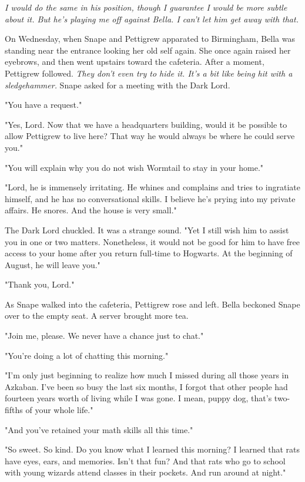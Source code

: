\emph{I would do the same in his position, though I guarantee I would be more subtle about it. But he's playing me off against Bella. I can't let him get away with that.}

On Wednesday, when Snape and Pettigrew apparated to Birmingham, Bella was standing near the entrance looking her old self again. She once again raised her eyebrows, and then went upstairs toward the cafeteria. After a moment, Pettigrew followed. \emph{They don't even try to hide it. It's a bit like being hit with a sledgehammer.} Snape asked for a meeting with the Dark Lord.

"You have a request."

"Yes, Lord. Now that we have a headquarters building, would it be possible to allow Pettigrew to live here? That way he would always be where he could serve you."

"You will explain why you do not wish Wormtail to stay in your home."

"Lord, he is immensely irritating. He whines and complains and tries to ingratiate himself, and he has no conversational skills. I believe he's prying into my private affairs. He snores. And the house is very small."

The Dark Lord chuckled. It was a strange sound. "Yet I still wish him to assist you in one or two matters. Nonetheless, it would not be good for him to have free access to your home after you return full-time to Hogwarts. At the beginning of August, he will leave you."

"Thank you, Lord."

As Snape walked into the cafeteria, Pettigrew rose and left. Bella beckoned Snape over to the empty seat. A server brought more tea.

"Join me, please. We never have a chance just to chat."

"You're doing a lot of chatting this morning."

"I'm only just beginning to realize how much I missed during all those years in Azkaban. I've been so busy the last six months, I forgot that other people had fourteen years worth of living while I was gone. I mean, puppy dog, that's two-fifths of your whole life."

"And you've retained your math skills all this time."

"So sweet. So kind. Do you know what I learned this morning? I learned that rats have eyes, ears, and memories. Isn't that fun? And that rats who go to school with young wizards attend classes in their pockets. And run around at night."

